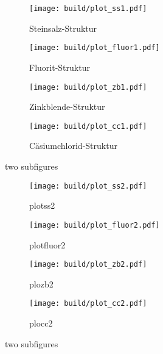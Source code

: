 \begin{figure}[hhh]
  \centering
  \begin{subfigure}{.45\textwidth}
    \centering
    \texttt{[image: build/plot\_ss1.pdf]}
    \caption{Steinsalz-Struktur}
    \label{subfig:ss1}
  \end{subfigure}
  \begin{subfigure}{.45\textwidth}
    \centering
    \texttt{[image: build/plot\_fluor1.pdf]}
    \caption{Fluorit-Struktur}
    \label{subfig:fluo1}
  \end{subfigure}
  \begin{subfigure}{.45\textwidth}
    \centering
    \texttt{[image: build/plot\_zb1.pdf]}
    \caption{Zinkblende-Struktur}
    \label{subfig:zb1}
  \end{subfigure}
  \begin{subfigure}{.45\textwidth}
    \centering
    \texttt{[image: build/plot\_cc1.pdf]}
    \caption{Cäsiumchlorid-Struktur}
    \label{subfig:cc1}
  \end{subfigure}
  \caption{two subfigures}
  \label{fig:salz1}
\end{figure}

\begin{figure}[hhh]
  \centering
  \begin{subfigure}{.45\textwidth}
    \centering
    \texttt{[image: build/plot\_ss2.pdf]}
    \caption{plotss2}
    \label{subfig:cool21}
  \end{subfigure}
  \begin{subfigure}{.45\textwidth}
    \centering
    \texttt{[image: build/plot\_fluor2.pdf]}
    \caption{plotfluor2}
    \label{subfig:cool22}
  \end{subfigure}
  \begin{subfigure}{.45\textwidth}
    \centering
    \texttt{[image: build/plot\_zb2.pdf]}
    \caption{plozb2}
    \label{subfig:cool23}
  \end{subfigure}
  \begin{subfigure}{.45\textwidth}
    \centering
    \texttt{[image: build/plot\_cc2.pdf]}
    \caption{plocc2}
    \label{subfig:cool24}
  \end{subfigure}
  \caption{two subfigures}
  \label{fig:very cool2}
\end{figure}
